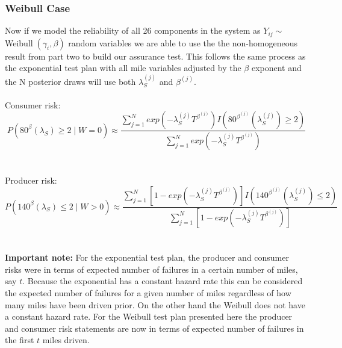 \documentclass[12pt]{article}
\begin{document}
\subsubsection{Weibull Case}
Now if we model the reliability of all 26 components in the system as
$Y_{ij} \sim$ Weibull$\;(\gamma_i, \beta) $ random variables we are able to use
the the non-homogeneous result from part two to build our assurance test. This
follows the same process as the exponential test plan with all mile variables
adjusted by the $\beta$ exponent and the N posterior draws will use both
$\lambda_S^{(j)}$ and $\beta^{(j)}$.
\\
\\
Consumer risk:
\\
$$
	 P(80^\beta (\lambda_S) \geq 2 \; \vert \; W = 0) \approx \frac{\sum_{j = 1}^{N} exp(-\lambda_S^{(j)} T^{\beta^{(j)}})I(80^{\beta^{(j)}} (\lambda_S^{(j)}) \geq 2)} {\sum_{j = 1}^{N} exp(-\lambda_S^{(j)} T^{\beta^{(j)}})}
$$
\\
\\
Producer risk:
\\
$$
	 P(140^\beta (\lambda_S) \leq 2 \; \vert \; W > 0) \approx  \frac{\sum_{j = 1}^{N} [1 - exp(-\lambda_S^{(j)} T^{\beta^{(j)}})] I(140^{\beta^{(j)}} (\lambda_S^{(j)}) \leq 2)} {\sum_{j = 1}^{N} [1 - exp(-\lambda_S^{(j)} T^{\beta^{(j)}})]}
$$
\\
\\
\textbf{Important note:} For the exponential test plan, the producer and
consumer risks were in terms of expected number of failures in a certain number
of miles, say $t$.  Because the exponential has a constant hazard rate this can
be considered the expected number of failures for a given number of miles
regardless of how many miles have been driven prior.  On the other hand the
Weibull does not have a constant hazard rate.  For the Weibull test plan
presented here the producer and consumer risk statements are now in terms of
expected number of failures in the first $t$ miles driven.
\end{document}
